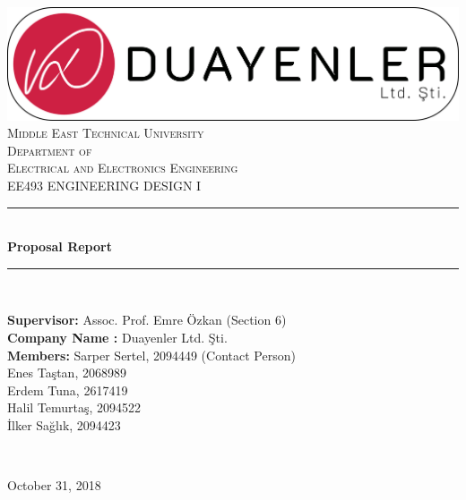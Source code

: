 \documentclass[a4paper,12pt]{article}
\begin{document}
\begin{titlepage}

\newcommand{\HRule}{\rule{\linewidth}{0.5mm}} %
\centering 

\includegraphics[width=\textwidth,height=\textheight,keepaspectratio]{images/logo3-with-stroke}\\[1cm]

\textsc{\LARGE Middle East Technical University}\\[1.5cm] %
\textsc{\Large Department of \\Electrical and Electronics Engineering }\\[0.5cm] %
\textsc{\large EE493 ENGINEERING DESIGN I}\\[0.5cm] %


\HRule \\[0.4cm]
{ \huge \bfseries  Proposal Report}\\[0cm] %
\HRule \\[1cm]

\begin{minipage}{\textwidth}
\begin{flushleft}
	\large{\textbf{Supervisor\hspace{1.55cm}:}}	Assoc. Prof. Emre Özkan (Section 6)\\
	\large{\textbf{Company Name :}}	Duayenler Ltd. Şti.\\
	\large{\textbf{Members\hspace{1.89cm}:}}
	Sarper Sertel, 2094449 (Contact Person) \\\hspace{4.39cm} 
	Enes Taştan, 2068989 \\\hspace{4.39cm} 
	Erdem Tuna, 2617419 \\\hspace{4.39cm} 
	Halil Temurtaş, 2094522 \\\hspace{4.39cm} 
	İlker Sağlık, 2094423   \\
\end{flushleft}
\end{minipage}\\[1cm]

\begin{flushbottom}
{\large October 31, 2018}\\[1cm] %
\end{flushbottom}

\end{titlepage}
\end{document}
